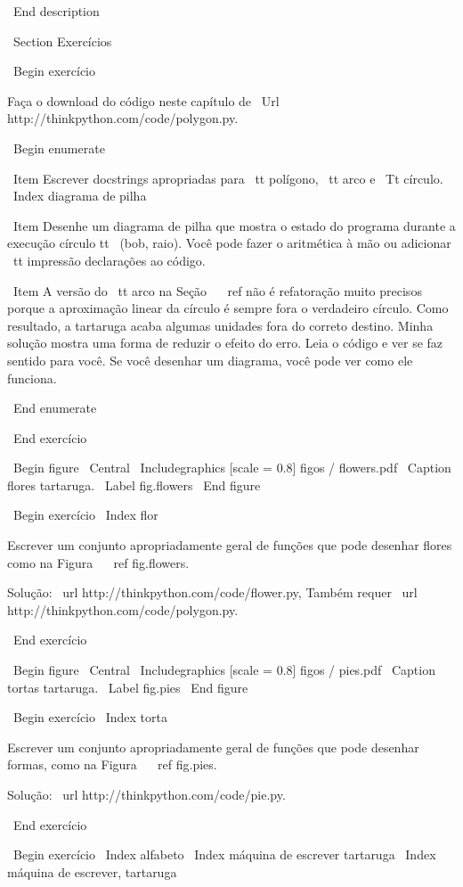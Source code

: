 \documentclass[10pt]{book}
\begin{document}
\begin {itemize}
{\ End {description}


\ Section {Exercícios}

\ Begin {} exercício

Faça o download do código neste capítulo de
\ Url {http://thinkpython.com/code/polygon.py}.

\ Begin {enumerate}

\ Item Escrever docstrings apropriadas para {\ tt polígono}, {\ tt arco} e
{\ Tt círculo}.
\ Index {diagrama de pilha}

\ Item Desenhe um diagrama de pilha que mostra o estado do programa
durante a execução {círculo tt \ (bob, raio)}. Você pode fazer o
aritmética à mão ou adicionar {\ tt impressão} declarações ao código.

\ Item A versão do {\ tt arco} na Seção ~ \ ref {} não é refatoração
muito precisos porque a aproximação linear da
círculo é sempre fora o verdadeiro círculo. Como resultado,
a tartaruga acaba algumas unidades fora do correto
destino. Minha solução mostra uma forma de reduzir
o efeito do erro. Leia o código e ver se faz
sentido para você. Se você desenhar um diagrama, você pode ver como ele funciona.

\ End {enumerate}

\ End {} exercício

\ Begin {figure}
\ Central
{\ Includegraphics [scale = 0.8] {figos / flowers.pdf}}
\ Caption {flores tartaruga.}
\ Label {} fig.flowers
\ End {figure}

\ Begin {} exercício
\ Index {flor}

Escrever um conjunto apropriadamente geral de funções que
pode desenhar flores como na Figura ~ \ ref {} fig.flowers.

Solução: \ url {http://thinkpython.com/code/flower.py},
Também requer \ url {http://thinkpython.com/code/polygon.py}.

\ End {} exercício

\ Begin {figure}
\ Central
{\ Includegraphics [scale = 0.8] {figos / pies.pdf}}
\ Caption {tortas tartaruga.}
\ Label {} fig.pies
\ End {figure}


\ Begin {} exercício
\ Index {torta}

Escrever um conjunto apropriadamente geral de funções que
pode desenhar formas, como na Figura ~ \ ref {} fig.pies.

Solução: \ url {http://thinkpython.com/code/pie.py}.

\ End {} exercício

\ Begin {} exercício
\ Index {alfabeto}
\ Index {máquina de escrever tartaruga}
\ Index {máquina de escrever, tartaruga}

}
\end{itemize}
\end{document}

